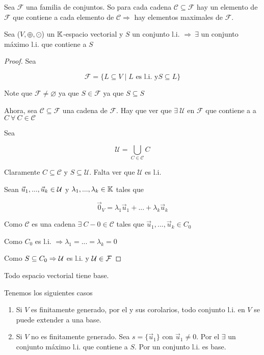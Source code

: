\begin{lemma}
    Sea $\mathcal{F}$ una familia de conjuntos. So para cada cadena $\mathscr{C} \subseteq \mathcal{F}$ hay un elemento de $\mathcal{F}$ que contiene a cada elemento de $\mathscr{C} \Rightarrow$ hay elementos maximales de $\mathcal{F}$. 
\end{lemma}

\begin{theorem} \label{theom125}
    Sea ($V, \oplus, \odot$) un $\mathbb{K}$-espacio vectorial y $S$ un conjunto l.i. $\Rightarrow \: \exists$ un conjunto máximo l.i. que contiene a $S$
\end{theorem}

\begin{proof}
    Sea

    $$\mathcal{F} = \{ L \subseteq V \mid L \text{ es l.i. y} S \subseteq L \}$$

    Note que $\mathcal{F} \neq \varnothing$ ya que $S \in \mathcal{F}$ ya que $S \subseteq S$

    Ahora, sea $\mathscr{C} \subseteq \mathcal{F}$ una cadena de $\mathcal{F}$. Hay que ver que $\exists \: \mathcal{U}$ en $\mathcal{F}$ que contiene a a $C \: \forall \: C \in \mathscr{C}$

    Sea 

    $$\mathcal{U} = \bigcup_{C \in \mathscr{C}} C$$

    Claramente $C \subseteq \mathscr{C}$ y $S \subseteq \mathcal{U}$. Falta ver que $\mathcal{U}$ es l.i. 

    Sean $\vec{u}_{1},...,\vec{u}_{k} \in \mathcal{U}$ y $\lambda_1,...,\lambda_k \in \mathbb{K}$ tales que

    $$\vec{0}_{V} = \lambda_1 \vec{u}_{1} + ... + \lambda_k \vec{u}_{k}$$

    Como $\mathscr{C}$ es una cadena $\exists \: C-0 \in \mathscr{C}$ tales que $\vec{u}_{1},...,\vec{u}_{k}  \in C_0$

    Como $C_0$ es l.i. $\Rightarrow \lambda_1 = ... = \lambda_k = 0$

    Como $S \subseteq C_0 \Rightarrow \mathcal{U}$ es l.i. y $\mathcal{U} \in \mathcal{F}$ 
\end{proof}

\begin{corollary}
    Todo espacio vectorial tiene base.
\end{corollary}

\begin{orangeproof}

Tenemos los siguientes casos

    \begin{enumerate}
        \item Si $V$ es finitamente generado, por el  y sus corolarios, todo conjunto l.i. en $V$ se puede extender a una base.
        \item Si $V$ no es finitamente generado. Sea $s = \{ \vec{u}_{1} \}$ con $\vec{u}_{1} \neq 0$. Por el  $\exists$ un conjunto máximo l.i. que contiene a $S$. Por  un conjunto l.i. es base. 
    \end{enumerate}
\end{orangeproof}

